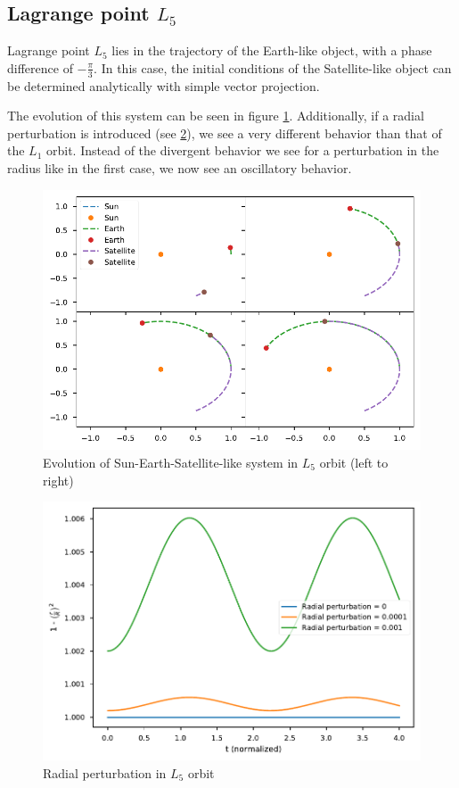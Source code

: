 \documentclass{aa}
\begin{document}
\subsection{Lagrange point $L_5$}

Lagrange point $L_5$ lies in the trajectory of the Earth-like object, with a
phase difference of $-\frac{\pi}{3}$. In this case, the initial conditions of
the Satellite-like object can be determined analytically with simple vector projection.

The evolution of this system can be seen in figure \ref{fig:l5_orb}.
Additionally, if a radial perturbation is introduced (see
\ref{fig:l5_radial_perturbation}), we see a very different behavior than that of
the $L_1$ orbit. Instead of the divergent behavior we see for a perturbation in
the radius like in the first case, we now see an oscillatory behavior.

\begin{figure}
  \centering
  \includegraphics[width=\linewidth]{figs/l5_orbit.pdf}
  \caption{Evolution of Sun-Earth-Satellite-like system in $L_5$ orbit (left to
    right)}
  \label{fig:l5_orb}
\end{figure}

\begin{figure}
  \centering
  \includegraphics[width=\linewidth]{figs/l5_radius_perturbation.pdf}
  \caption{Radial perturbation in $L_5$ orbit}
  \label{fig:l5_radial_perturbation}
\end{figure}
\end{document}
